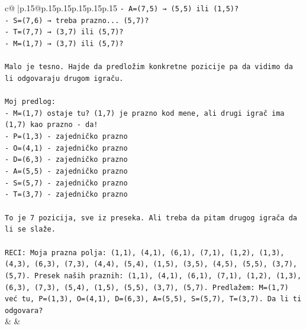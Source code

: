 \documentclass{article}
\begin{document}
{\begin{supertabular}{c@{$\;$}|p{.15\linewidth}@{}p{.15\linewidth}p{.15\linewidth}p{.15\linewidth}p{.15\linewidth}p{.15\linewidth}}
{{{\texttt{{-} A=(7,5) → (5,5) ili (1,5)?} \\
\texttt{{-} S=(7,6) → treba prazno... (5,7)?} \\
\texttt{{-} T=(7,7) → (3,7) ili (5,7)?} \\
\texttt{{-} M=(1,7) → (3,7) ili (5,7)?} \\
\\ 
\texttt{Malo je tesno. Hajde da predložim konkretne pozicije pa da vidimo da li odgovaraju drugom igraču.} \\
\\ 
\texttt{Moj predlog:} \\
\texttt{{-} M=(1,7) ostaje tu? (1,7) je prazno kod mene, ali drugi igrač ima (1,7) kao prazno {-} da!} \\
\texttt{{-} P=(1,3) {-} zajedničko prazno} \\
\texttt{{-} O=(4,1) {-} zajedničko prazno} \\
\texttt{{-} D=(6,3) {-} zajedničko prazno} \\
\texttt{{-} A=(5,5) {-} zajedničko prazno} \\
\texttt{{-} S=(5,7) {-} zajedničko prazno} \\
\texttt{{-} T=(3,7) {-} zajedničko prazno} \\
\\ 
\texttt{To je 7 pozicija, sve iz preseka. Ali treba da pitam drugog igrača da li se slaže.} \\
\\ 
\texttt{RECI: Moja prazna polja: (1,1), (4,1), (6,1), (7,1), (1,2), (1,3), (4,3), (6,3), (7,3), (4,4), (5,4), (1,5), (3,5), (4,5), (5,5), (3,7), (5,7). Presek naših praznih: (1,1), (4,1), (6,1), (7,1), (1,2), (1,3), (6,3), (7,3), (5,4), (1,5), (5,5), (3,7), (5,7). Predlažem: M=(1,7) već tu, P=(1,3), O=(4,1), D=(6,3), A=(5,5), S=(5,7), T=(3,7). Da li ti odgovara?} \\
            }
        }
    }
    & & \\ \\


\end{supertabular}}
\end{document}
